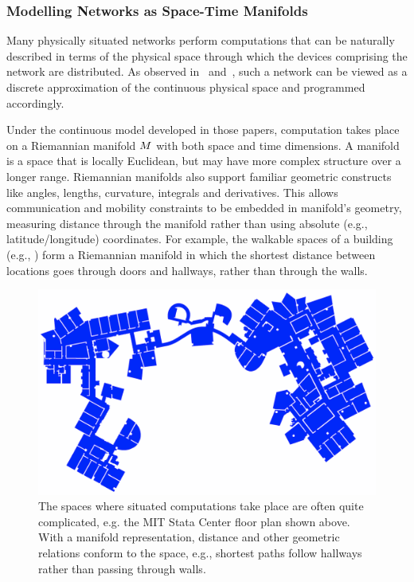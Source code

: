 \documentclass[12pt,a4paper,twoside,openright]{book}
\begin{document}
\subsubsection{Modelling Networks as Space-Time Manifolds}

Many physically situated networks perform computations that can be naturally described in terms of the physical space through which the devices comprising the network are distributed.
%
As observed in~\cite{upp} and~\cite{bealBasisSCW10}, such a network can be viewed as a discrete approximation of the continuous physical space and programmed accordingly.

Under the continuous model developed in those papers, computation takes place on a Riemannian manifold $M$ with both space and time dimensions.
%
A manifold is a space that is locally Euclidean, but may have more complex structure over a longer range.  Riemannian manifolds also support familiar geometric constructs like angles, lengths, curvature, integrals and derivatives.
%
This allows communication and mobility constraints to be embedded in manifold's geometry, measuring distance through the manifold rather than using absolute (e.g., latitude/longitude) coordinates.
%
For example, the walkable spaces of a building (e.g., ) form a Riemannian manifold in which the shortest distance between locations goes through doors and hallways, rather than through the walls.

\begin{figure}
\centering
\includegraphics[width=\columnwidth]{img/32_D5}
\caption[MIT Stata Center floor plan]{The spaces where situated computations take place are often quite complicated, e.g. the MIT Stata Center floor plan shown above. 
         With a manifold representation, distance and other geometric relations conform to the space, e.g., shortest paths follow hallways rather than passing through walls.}
\label{f:manifold}
\end{figure}
\end{document}
